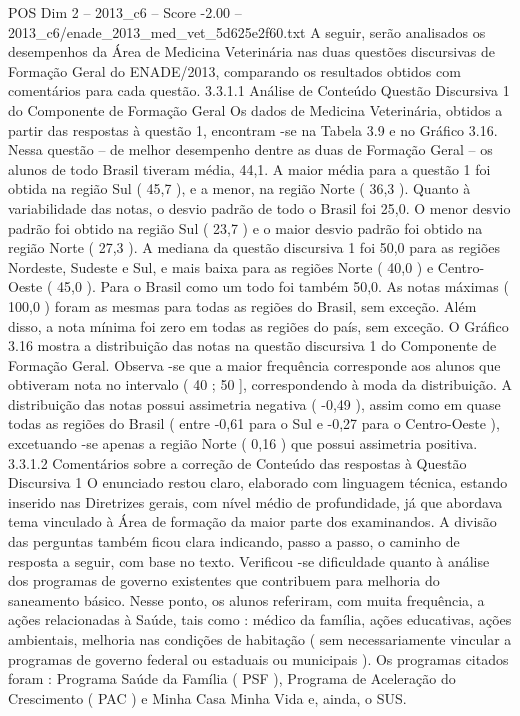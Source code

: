 \begin{textsample}{POS Dim 2 – 2013\_c6 – Score -2.00 – 2013\_c6/enade\_2013\_med\_vet\_5d625e2f60.txt}
A seguir, serão analisados os desempenhos da Área de Medicina Veterinária nas duas questões discursivas de Formação Geral do ENADE/2013, comparando os resultados obtidos com comentários para cada questão. 3.3.1.1 Análise de Conteúdo Questão Discursiva 1 do Componente de Formação Geral Os dados de Medicina Veterinária, obtidos a partir das respostas à questão 1, encontram -se na Tabela 3.9 e no Gráfico 3.16.
Nessa questão – de melhor desempenho dentre as duas de Formação Geral – os alunos de todo Brasil tiveram média, 44,1.
A maior média para a questão 1 foi obtida na região Sul ( 45,7 ), e a menor, na região Norte ( 36,3 ).
Quanto à variabilidade das notas, o desvio padrão de todo o Brasil foi 25,0.
O menor desvio padrão foi obtido na região Sul ( 23,7 ) e o maior desvio padrão foi obtido na região Norte ( 27,3 ).
A mediana da questão discursiva 1 foi 50,0 para as regiões Nordeste, Sudeste e Sul, e mais baixa para as regiões Norte ( 40,0 ) e Centro-Oeste ( 45,0 ).
Para o Brasil como um todo foi também 50,0.
As notas máximas ( 100,0 ) foram as mesmas para todas as regiões do Brasil, sem exceção.
Além disso, a nota mínima foi zero em todas as regiões do país, sem exceção.
O Gráfico 3.16 mostra a distribuição das notas na questão discursiva 1 do Componente de Formação Geral.
Observa -se que a maior frequência corresponde aos alunos que obtiveram nota no intervalo ( 40 ; 50 ], correspondendo à moda da distribuição.
A distribuição das notas possui assimetria negativa ( -0,49 ), assim como em quase todas as regiões do Brasil ( entre -0,61 para o Sul e -0,27 para o Centro-Oeste ), excetuando -se apenas a região Norte ( 0,16 ) que possui assimetria positiva. 3.3.1.2 Comentários sobre a correção de Conteúdo das respostas à Questão Discursiva 1 O enunciado restou claro, elaborado com linguagem técnica, estando inserido nas Diretrizes gerais, com nível médio de profundidade, já que abordava tema vinculado à Área de formação da maior parte dos examinandos.
A divisão das perguntas também ficou clara indicando, passo a passo, o caminho de resposta a seguir, com base no texto.
Verificou -se dificuldade quanto à análise dos programas de governo existentes que contribuem para melhoria do saneamento básico.
Nesse ponto, os alunos referiram, com muita frequência, a ações relacionadas à Saúde, tais como : médico da família, ações educativas, ações ambientais, melhoria nas condições de habitação ( sem necessariamente vincular a programas de governo federal ou estaduais ou municipais ).
Os programas citados foram : Programa Saúde da Família ( PSF ), Programa de Aceleração do Crescimento ( PAC ) e Minha Casa Minha Vida e, ainda, o SUS.

\end{textsample}
